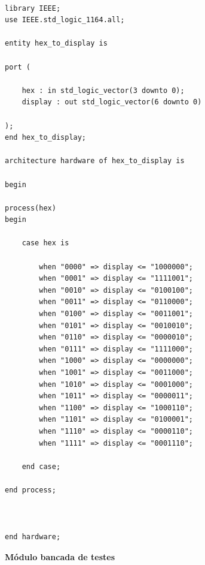 \documentclass{article}
\begin{document}
\begin{verbatim}

library IEEE;
use IEEE.std_logic_1164.all;

entity hex_to_display is 

port (
	
	hex : in std_logic_vector(3 downto 0);
	display : out std_logic_vector(6 downto 0)

);
end hex_to_display;

architecture hardware of hex_to_display is

begin

process(hex)
begin

	case hex is
	
		when "0000" => display <= "1000000";
		when "0001" => display <= "1111001";
		when "0010" => display <= "0100100";
		when "0011" => display <= "0110000";
		when "0100" => display <= "0011001";
		when "0101" => display <= "0010010";
		when "0110" => display <= "0000010";
		when "0111" => display <= "1111000";
		when "1000" => display <= "0000000";
		when "1001" => display <= "0011000";
		when "1010" => display <= "0001000";
		when "1011" => display <= "0000011";
		when "1100" => display <= "1000110";
		when "1101" => display <= "0100001";
		when "1110" => display <= "0000110";
		when "1111" => display <= "0001110";
		
	end case;
		
end process;



end hardware;

\end{verbatim}

\textbf{Módulo bancada de testes}
\end{document}
